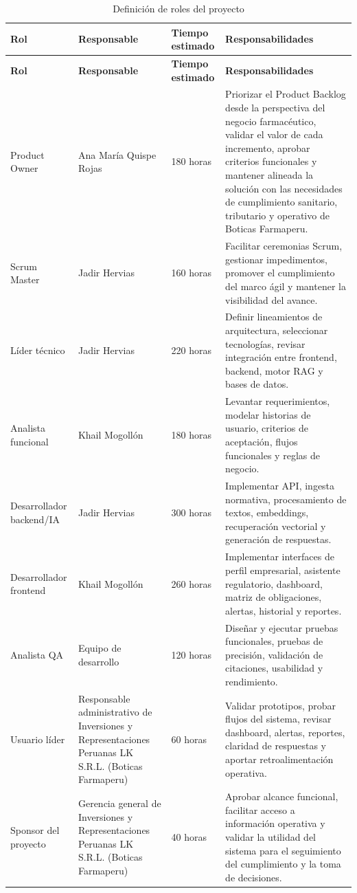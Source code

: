 \documentclass[12pt,a4paper,oneside]{report}
\begin{document}
\begin{longtable}{p{}p{}p{}p{}}
\caption{Definición de roles del proyecto}\label{tab:cap3-definicion-roles}\\
\toprule
\textbf{Rol} & \textbf{Responsable} & \textbf{Tiempo estimado} & \textbf{Responsabilidades} \\
\midrule
\endfirsthead
\toprule
\textbf{Rol} & \textbf{Responsable} & \textbf{Tiempo estimado} & \textbf{Responsabilidades} \\
\midrule
\endhead
Product Owner & Ana María Quispe Rojas & 180 horas & Priorizar el Product Backlog desde la perspectiva del negocio farmacéutico, validar el valor de cada incremento, aprobar criterios funcionales y mantener alineada la solución con las necesidades de cumplimiento sanitario, tributario y operativo de Boticas Farmaperu. \\
Scrum Master & Jadir Hervias & 160 horas & Facilitar ceremonias Scrum, gestionar impedimentos, promover el cumplimiento del marco ágil y mantener la visibilidad del avance. \\
Líder técnico & Jadir Hervias & 220 horas & Definir lineamientos de arquitectura, seleccionar tecnologías, revisar integración entre frontend, backend, motor RAG y bases de datos. \\
Analista funcional & Khail Mogollón & 180 horas & Levantar requerimientos, modelar historias de usuario, criterios de aceptación, flujos funcionales y reglas de negocio. \\
Desarrollador backend/IA & Jadir Hervias & 300 horas & Implementar API, ingesta normativa, procesamiento de textos, embeddings, recuperación vectorial y generación de respuestas. \\
Desarrollador frontend & Khail Mogollón & 260 horas & Implementar interfaces de perfil empresarial, asistente regulatorio, dashboard, matriz de obligaciones, alertas, historial y reportes. \\
Analista QA & Equipo de desarrollo & 120 horas & Diseñar y ejecutar pruebas funcionales, pruebas de precisión, validación de citaciones, usabilidad y rendimiento. \\
Usuario líder & Responsable administrativo de Inversiones y Representaciones Peruanas LK S.R.L. (Boticas Farmaperu) & 60 horas & Validar prototipos, probar flujos del sistema, revisar dashboard, alertas, reportes, claridad de respuestas y aportar retroalimentación operativa. \\
Sponsor del proyecto & Gerencia general de Inversiones y Representaciones Peruanas LK S.R.L. (Boticas Farmaperu) & 40 horas & Aprobar alcance funcional, facilitar acceso a información operativa y validar la utilidad del sistema para el seguimiento del cumplimiento y la toma de decisiones. \\
\bottomrule
\end{longtable}
\end{document}
